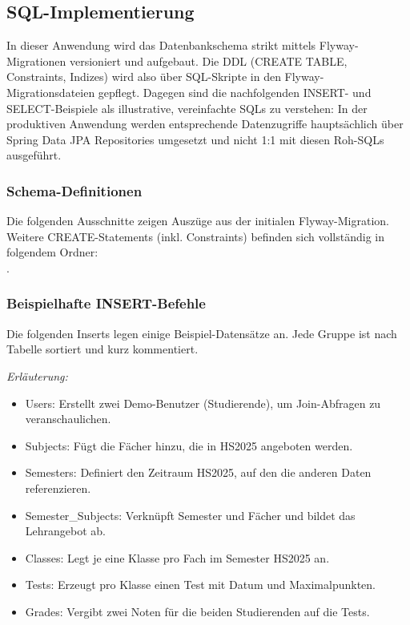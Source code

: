 \documentclass[12pt,a4paper]{article}
\newcommand{\code}[1]{\texttt{\detokenize{#1}}}
\begin{document}

    \subsection{SQL-Implementierung}
    In dieser Anwendung wird das Datenbankschema strikt mittels Flyway-Migrationen versioniert und aufgebaut.
    Die DDL (CREATE TABLE, Constraints, Indizes) wird also über SQL-Skripte in den Flyway-Migrationsdateien gepflegt.
    Dagegen sind die nachfolgenden INSERT- und SELECT-Beispiele als illustrative, vereinfachte SQLs zu verstehen:
    In der produktiven Anwendung werden entsprechende Datenzugriffe hauptsächlich über Spring Data JPA Repositories
    umgesetzt und nicht 1:1 mit diesen Roh-SQLs ausgeführt.

    \subsubsection{Schema-Definitionen}

    Die folgenden Ausschnitte zeigen Auszüge aus der initialen Flyway-Migration. Weitere CREATE-Statements (inkl. Constraints)
    befinden sich vollständig in folgendem Ordner: \\
    \code{src/main/resources/db/migration}.

    

    \subsubsection{Beispielhafte INSERT-Befehle}
    \noindent Die folgenden Inserts legen einige Beispiel-Datensätze an. Jede Gruppe ist nach Tabelle sortiert und kurz kommentiert.
    

    \textit{Erläuterung:}
    \begin{itemize}
        \item Users: Erstellt zwei Demo-Benutzer (Studierende), um Join-Abfragen zu veranschaulichen.
        \item Subjects: Fügt die Fächer hinzu, die in HS2025 angeboten werden.
        \item Semesters: Definiert den Zeitraum HS2025, auf den die anderen Daten referenzieren.
        \item Semester\_Subjects: Verknüpft Semester und Fächer und bildet das Lehrangebot ab.
        \item Classes: Legt je eine Klasse pro Fach im Semester HS2025 an.
        \item Tests: Erzeugt pro Klasse einen Test mit Datum und Maximalpunkten.
        \item Grades: Vergibt zwei Noten für die beiden Studierenden auf die Tests.
    \end{itemize}
\end{document}
